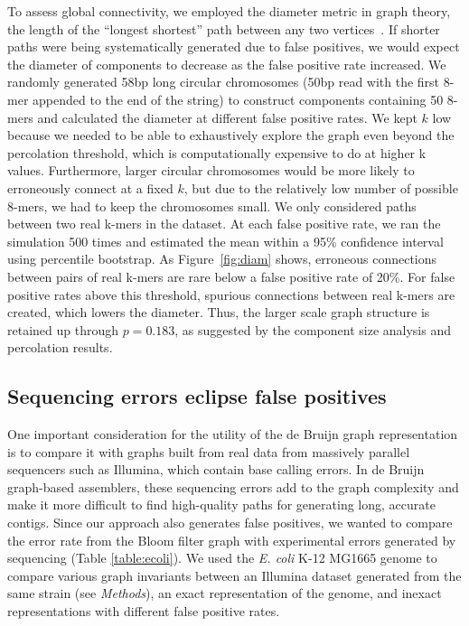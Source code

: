\documentclass{pnastwo}
\begin{document}
\begin{article}
To assess global connectivity, we employed the diameter metric in
graph theory, the length of the ``longest shortest'' path between any two
vertices~\cite{bondy2008graph}.  If shorter paths were being systematically
generated due to false positives, we would expect the diameter of components to
decrease as the false positive rate increased.
We randomly generated 58bp
long circular chromosomes (50bp read with the first 8-mer appended to the 
end of the string) to construct components containing 50 8-mers
and calculated the diameter at different false positive rates. We kept 
$k$ low because we needed to be able to exhaustively explore the graph 
even beyond the percolation threshold, which is computationally 
expensive to do at higher k values. Furthermore, larger circular chromosomes 
would be more likely to erroneously connect at a fixed $k$, but due to the 
relatively low number of possible 8-mers, we had to keep the chromosomes 
small.  
We only considered paths
between two real k-mers in the dataset.  
At each
false positive rate, we ran the simulation 500 times and estimated the
mean within a 95\% confidence interval using percentile bootstrap. As
Figure~\ref{fig:diam} shows, erroneous connections between pairs of
real k-mers are rare below a false positive rate of 20\%.
For false positive rates above this threshold, spurious
connections between real k-mers are created, which lowers the
diameter.  Thus, the larger scale graph structure is retained up through
$p = 0.183$, as suggested by the component size analysis and
percolation results.

\subsection{Sequencing errors eclipse false positives}

One important consideration for the utility of the de Bruijn graph
representation is to compare it with graphs built from real data from
massively parallel sequencers such as Illumina, which contain base
calling errors.  In de Bruijn graph-based assemblers, these sequencing
errors add to the graph complexity and make it more difficult to find
high-quality paths for generating long, accurate contigs. Since our
approach also generates false positives, we wanted to compare the
error rate from the Bloom filter graph with experimental errors
generated by sequencing (Table \ref{table:ecoli}). We used the \emph{E. coli} K-12
MG1665 genome to compare various graph invariants between an Illumina
dataset generated from the same strain (see \emph{Methods}), an exact
representation of the genome, and inexact representations with
different false positive rates.


\end{article}
\end{document}
